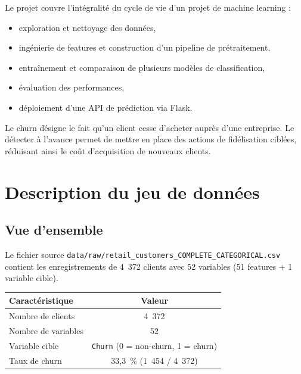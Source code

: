 \documentclass[11pt,a4paper]{article}
\begin{document}
Le projet couvre l'intégralité du cycle de vie d'un projet de machine learning :
\begin{itemize}[noitemsep]
    \item exploration et nettoyage des données,
    \item ingénierie de features et construction d'un pipeline de prétraitement,
    \item entraînement et comparaison de plusieurs modèles de classification,
    \item évaluation des performances,
    \item déploiement d'une API de prédiction via Flask.
\end{itemize}

\begin{tcolorbox}[title=Contexte métier]
Le churn désigne le fait qu'un client cesse d'acheter auprès d'une entreprise. Le détecter à l'avance permet de mettre en place des actions de fidélisation ciblées, réduisant ainsi le coût d'acquisition de nouveaux clients.
\end{tcolorbox}

\section{Description du jeu de données}

\subsection{Vue d'ensemble}

Le fichier source \texttt{data/raw/retail\_customers\_COMPLETE\_CATEGORICAL.csv} contient les enregistrements de 4~372 clients avec 52 variables (51 features + 1 variable cible).

\begin{center}
\begin{tabular}{lc}
\toprule
\textbf{Caractéristique} & \textbf{Valeur} \\
\midrule
Nombre de clients & 4~372 \\
Nombre de variables & 52 \\
Variable cible & \texttt{Churn} (0 = non-churn, 1 = churn) \\
Taux de churn & 33,3~\% (1~454 / 4~372) \\
\bottomrule
\end{tabular}
\end{center}
\end{document}

